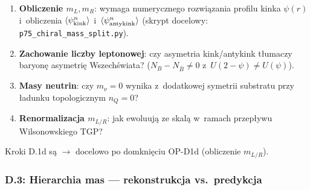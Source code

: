 \begin{remark}\label{rem:D1d-open}
\begin{enumerate}[nosep]
  \item \textbf{Obliczenie $m_L, m_R$}: wymaga numerycznego rozwi\k{a}zania
    profilu kinka $\psi(r)$ i~obliczenia
    $\langle\psi^n_{\rm kink}\rangle$ i~$\langle\psi^n_{\rm antykink}\rangle$
    (skrypt docelowy: \texttt{p75\_chiral\_mass\_split.py}).
  \item \textbf{Zachowanie liczby leptonowej}: czy asymetria kink/antykink
    t\l{}umaczy baryon\k{e} asymetri\k{e} Wszech\'swiata?
    ($N_B - N_{\bar{B}} \neq 0$ z~$U(2-\psi) \neq U(\psi)$).
  \item \textbf{Masy neutrin}: czy $m_\nu = 0$ wynika z~dodatkowej
    symetrii substratu przy \l{}adunku topologicznym $n_Q = 0$?
  \item \textbf{Renormalizacja $m_{L/R}$}: jak ewoluuj\k{a} ze skal\k{a}
    w~ramach przep\l{}ywu Wilsonowskiego TGP?
\end{enumerate}
Kroki D.1d s\k{a}  $\to$ docelowo 
po domkni\k{e}ciu OP-D1d (obliczenie $m_{L/R}$).
\end{remark}

\subsubsection{D.3: Hierarchia mas --- rekonstrukcja vs.\ predykcja}%
\label{sssec:mass-hierarchy-D3}

